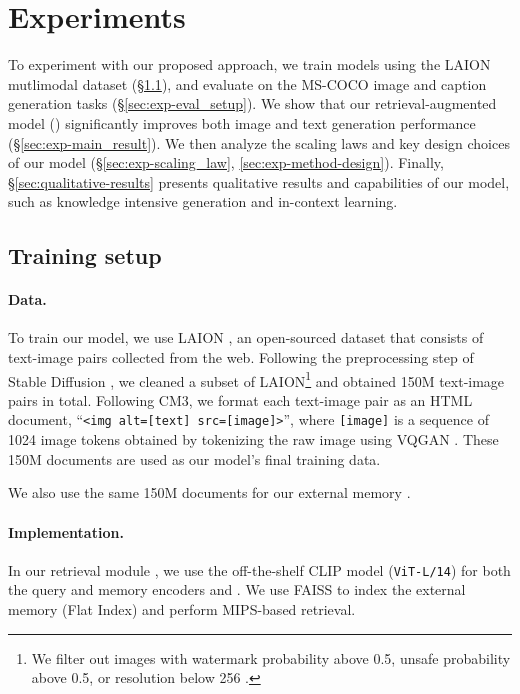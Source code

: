 \section{Experiments}
\label{sec:experiments}
To experiment with our proposed approach, we train models using the LAION mutlimodal dataset (\S \ref{sec:exp-train_setup}), and evaluate on the MS-COCO image and caption generation tasks (\S \ref{sec:exp-eval_setup}).
We show that our retrieval-augmented model (\methodname) significantly improves both image and text  generation performance (\S \ref{sec:exp-main_result}). 
We then analyze the scaling laws and key design choices of our model (\S \ref{sec:exp-scaling_law}, \ref{sec:exp-method-design}).
Finally, \S \ref{sec:qualitative-results} presents qualitative results and capabilities of our model, such as knowledge intensive generation and in-context learning.



\subsection{Training setup} 
\label{sec:exp-train_setup}
\paragraph{Data.}
To train our model, we use LAION \cite{schuhmann2021laion}, an open-sourced dataset that consists of text-image pairs collected from the web.
Following the preprocessing step of Stable Diffusion \cite{rombach2022high}, we cleaned a subset of LAION\footnote{We filter out images with watermark probability above 0.5, unsafe probability above 0.5, or resolution below 256 \!.} and obtained 150M text-image pairs in total. Following CM3, we format each text-image pair as an HTML document, ``\texttt{<img alt=[text] src=[image]>}'', where \texttt{[image]} is a sequence of 1024 image tokens obtained by tokenizing the raw image using VQGAN \cite{esser2021taming, gafni2022make}.
These 150M documents are used as our model's final training data. 

We also use the same 150M documents for our external memory .


\paragraph{Implementation.}
In our retrieval module , we use the off-the-shelf CLIP model (\texttt{ViT-L/14}) \cite{radford2021learning} for both the query and memory encoders  and .
We use FAISS \cite{johnson2019billion} to index the external memory  (Flat Index) and perform MIPS-based retrieval.

